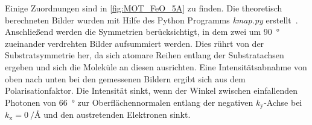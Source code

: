             Einige Zuordnungen sind in \autoref{fig:MOT_FeO_5A} zu finden.
            Die theoretisch berechneten Bilder wurden mit Hilfe des Python Programms \textit{kmap.py} erstellt~\cite{brandstetter_kmappy_2021}.
            Anschließend werden die Symmetrien berücksichtigt, in dem zwei um \SI{90}{\degree} zueinander verdrehten Bilder aufsummiert werden.
            Dies rührt von der Substratsymmetrie her, da sich atomare Reihen entlang der Substratachsen ergeben und sich die Moleküle an diesen ausrichten.
            Eine Intensitätsabnahme von oben nach unten bei den gemessenen Bildern ergibt sich aus dem Polarisationfaktor.
            Die Intensität sinkt, wenn der Winkel zwischen einfallenden Photonen von \SI{66}{\degree} zur Oberflächennormalen entlang der negativen $k_\text{y}$-Achse bei $k_\text{x} = \SI[per-mode=reciprocal]{0}{\per\angstrom}$ und den austretenden Elektronen sinkt.

